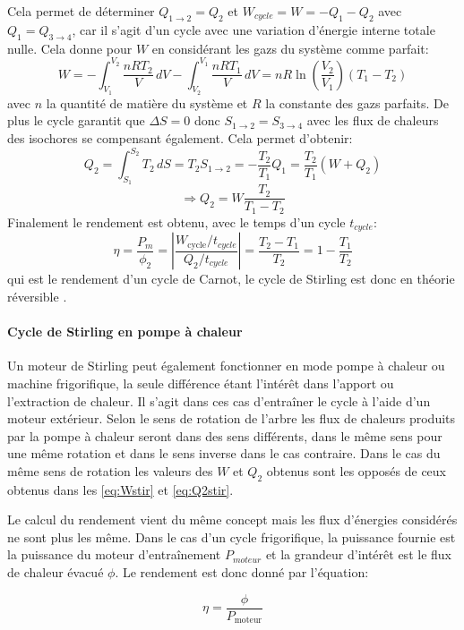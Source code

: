 Cela permet de déterminer \(Q_{1\to2} = Q_2\) et \(W_{cycle} = W = -Q_1 - Q_2\) avec \(Q_1 = Q_{3\to4}\), car il s'agit d'un cycle avec une variation d'énergie interne totale nulle. Cela donne pour \(W\) en considérant les gazs du système comme parfait:
\begin{equation}
    W = - \int_{V_1}^{V_2} \frac{nRT_2}{V} \, dV - \int_{V_2}^{V_1} \frac{nRT_1}{V} \, dV = nR\ln\left(\frac{V_2}{V_1}\right) (T_1 - T_2)
    \label{eq:Wstir}
\end{equation}
avec \(n\) la quantité de matière du système et \(R\) la constante des gazs parfaits.
De plus le cycle garantit que \(\Delta S = 0\) donc \(S_{1\to2} = S_{3\to4}\) avec les flux de chaleurs des isochores se compensant également. Cela permet d'obtenir:
\begin{equation}
    Q_2 = \int_{S_1}^{S_2} T_2 \, dS = T_2 S_{1\to2} = -\frac{T_2}{T_1} Q_1 = \frac{T_2}{T_1} (W + Q_2)
\end{equation}
\begin{equation}
    \Rightarrow Q_2 = W \frac{T_2}{T_1 - T_2}
    \label{eq:Q2stir}
\end{equation}
Finalement le rendement est obtenu, avec le temps d'un cycle \(t_{cycle}\):
\begin{equation}
    \eta = \frac{P_m}{\phi_2} = \left|\frac{W_\textrm{cycle}/t_{cycle}}{Q_2/t_{cycle}}\right| = \frac{T_2 - T_1}{T_2} = 1 - \frac{T_1}{T_2}
    \label{eq:rend-theorie}
\end{equation}
qui est le rendement d'un cycle de Carnot, le cycle de Stirling est donc en théorie réversible \cite{cours-thermo}.

\paragraph*{Cycle de Stirling en pompe à chaleur}
Un moteur de Stirling peut également fonctionner en mode pompe à chaleur ou machine frigorifique, la seule différence étant l'intérêt dans l'apport ou l'extraction de chaleur. Il s'agit dans ces cas d'entraîner le cycle à l'aide d'un moteur extérieur. Selon le sens de rotation de l'arbre les flux de chaleurs produits par la pompe à chaleur seront dans des sens différents, dans le même sens pour une même rotation et dans le sens inverse dans le cas contraire. Dans le cas du même sens de rotation les valeurs des \(W\) et \(Q_2\) obtenus sont les opposés de ceux obtenus dans les \autoref{eq:Wstir} et \autoref{eq:Q2stir}.

Le calcul du rendement vient du même concept mais les flux d'énergies considérés ne sont plus les même. Dans le cas d'un cycle frigorifique, la puissance fournie est la puissance du moteur d'entraînement \(P_{moteur}\) et la grandeur d'intérêt est le flux de chaleur évacué \(\phi\). Le rendement est donc donné par l'équation:

\begin{equation}
    \eta = \frac{\phi}{P_\textrm{moteur}}
    \label{eq:rend-frigo}
\end{equation}